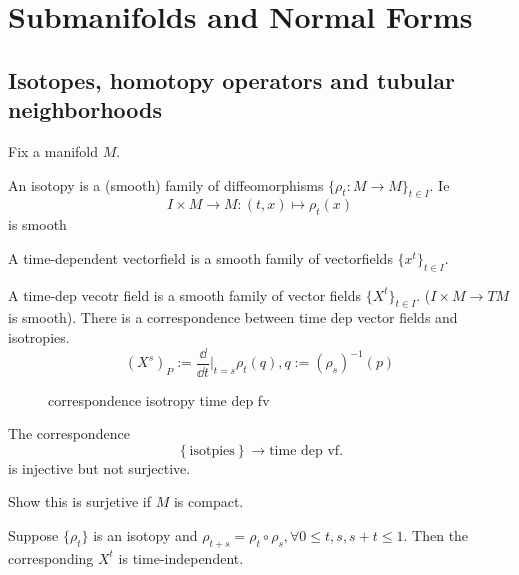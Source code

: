 \chapter{Submanifolds and Normal Forms} \label{chap:submanifolds_and_normal_forms}
\section{Isotopes, homotopy operators and tubular neighborhoods} \label{sec:isotopes,_homotopy_operators_and_tubular_neighborhoods}
Fix a manifold $M$. 
\begin{definition}
	An isotopy is a (smooth) family of diffeomorphisms $\{\rho_t: M \to M\} _{t \in I}$.  Ie  \[
		I\times  M \to M: (t, x) \mapsto  \rho_t(x) 
	\] is smooth 
\end{definition}
\begin{definition}
	A time-dependent vectorfield is a smooth family of vectorfields $\{x^{t}\} _{t \in I}$. 
\end{definition}
\begin{definition}
	A time-dep vecotr field is a smooth family of vector fields $\{X^{t}\} _{t \in I}$. ($I \times M \to TM$ is smooth).
	There is a correspondence between time dep vector fields and isotropies.
	\begin{equation}
		(X^{s})_P := \frac{\dd}{\dd t}|_{t = s} \rho_t(q), q:= (\rho_s)^{-1}(p)
	\end{equation}

\end{definition}
\begin{figure}[ht]
    \centering
    \caption{correspondence isotropy time dep fv}
    \label{fig:correspondence-isotropy-time-dep-fv}
\end{figure}
\begin{remark}
	The correspondence \[
	\left\{ \text{isotpies} \right\} \to \text{time dep vf}
	.\] is injective but not surjective.
\end{remark}
\begin{exercise}
	Show this is surjetive if $M$ is compact.
\end{exercise}

\begin{exercise}
	Suppose $\{\rho_t\} $ is an isotopy and $\rho_{t + s} = \rho_t \circ \rho_s, \forall 0 \le t, s, s + t \le 1$. Then the corresponding $X^{t}$ is time-independent.
\end{exercise}

